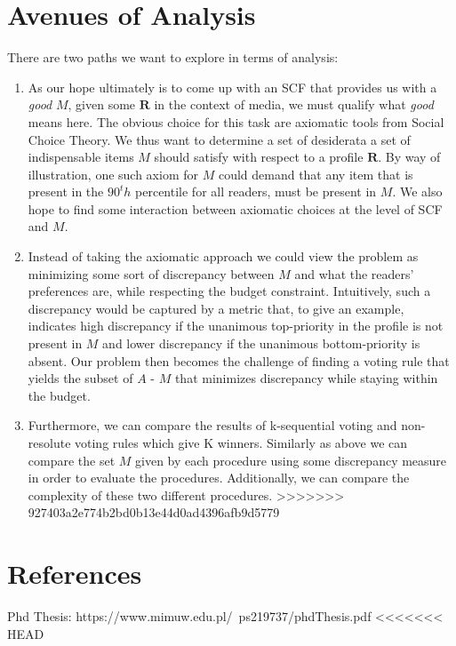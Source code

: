 \documentclass[10pt,a4paper, english]{article}
\begin{document}
\section{Avenues of Analysis} 
There are two paths we want to explore in terms of analysis:
\begin{enumerate}
\item As our hope ultimately is to come up with an SCF that provides us with a \textit{good} $M$, given some $\mathbf{R}$ in the context of media, we must qualify what \textit{good} means here. The obvious choice for this task are axiomatic tools from Social Choice Theory. We thus want to determine a set of desiderata a set of indispensable items $M$ should satisfy with respect to a profile $\mathbf{R}$. By way of illustration, one such axiom for $M$ could demand that any item that is present in the $90^th$ percentile for all readers, must be present in $M$.
We also hope to find some interaction between axiomatic choices at the level of SCF and $M$.
\item Instead of taking the axiomatic approach we could view the problem as minimizing some sort of discrepancy between $M$ and what the readers' preferences are, while respecting the budget constraint. Intuitively, such a discrepancy would be captured by a metric that, to give an example, indicates high discrepancy if the unanimous top-priority in the profile is not present in $M$ and lower discrepancy if the unanimous bottom-priority is absent. Our problem then becomes the challenge of finding a voting rule that yields the subset of $A$ - $M$ that minimizes discrepancy while staying within the budget.
\item Furthermore, we can compare the results of k-sequential voting and non-resolute voting rules which give K winners. Similarly as above we can compare the set $M$ given by each procedure using some discrepancy measure in order to evaluate the procedures. Additionally, we can compare the complexity of these two different procedures.
>>>>>>> 927403a2e774b2bd0b13e44d0ad4396afb9d5779
\end{enumerate}

\section{References}
Phd Thesis: https://www.mimuw.edu.pl/~ps219737/phdThesis.pdf
<<<<<<< HEAD
\end{document}
